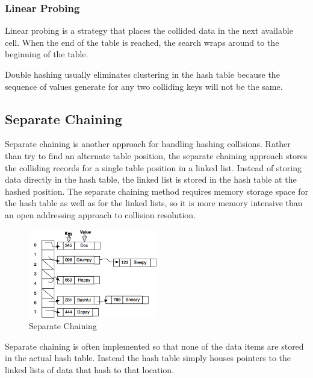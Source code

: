 \subsubsection{Linear Probing}

     Linear probing is a strategy that  places the collided data in the next available cell.  When the end of the table is reached, the search wraps around to the beginning of the table.
     




Double hashing usually eliminates clustering in the hash table because the sequence of values generate for any two colliding keys will not be the same.





\subsection{Separate Chaining}


 Separate chaining is another approach for handling hashing collisions. Rather than try to find an alternate table position, the separate chaining approach stores  the colliding records for a single table  position in a linked list.  Instead of storing data directly in the hash table, the linked list is stored in the hash table at the hashed position.   The separate chaining method requires memory storage space for the hash table as well as for the linked lists, so it is more memory intensive than an open addressing approach to collision resolution.  
   


\begin{figure}[H]
\centering
\includegraphics[width=0.5\textwidth]{pictures/Separate_Chaining_0.png}
\caption{Separate Chaining}
\label{fig:sepChain}
\end{figure}




     Separate chaining is often implemented so that none of the data items are stored in the actual hash table.
     Instead the hash table simply houses pointers to the linked lists of data that hash to that location.
     

